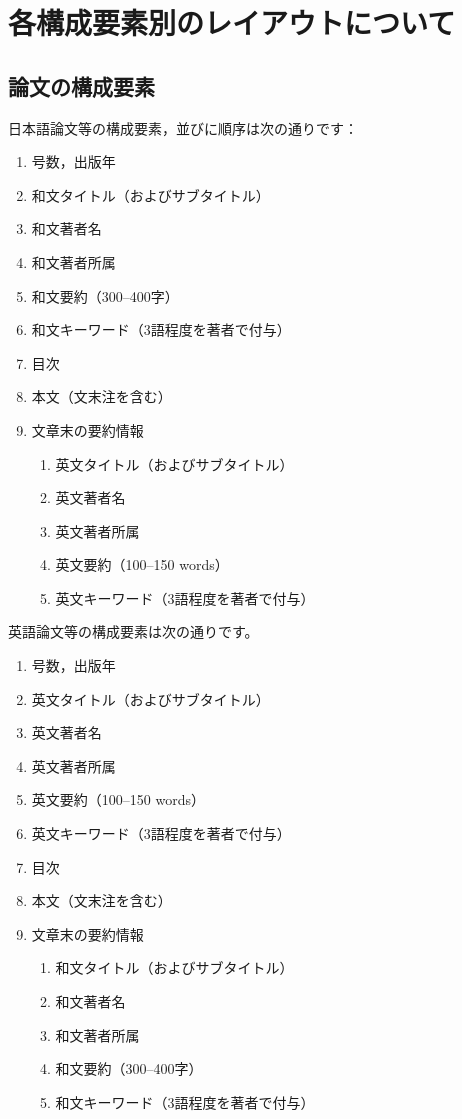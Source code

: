 \documentclass[b5paper,10pt,twocolumn,tombow]{jarticle}
\begin{document}
\section{各構成要素別のレイアウトについて}
\subsection{論文の構成要素}
日本語論文等の構成要素，並びに順序は次の通りです：
\begin{enumerate}
 \item 号数，出版年
 \item 和文タイトル（およびサブタイトル）
 \item 和文著者名
 \item 和文著者所属
 \item 和文要約（300--400字）
 \item 和文キーワード（3語程度を著者で付与）
 \item 目次
 \item 本文（文末注を含む）
 \item 文章末の要約情報
\begin{enumerate}
 \item 英文タイトル（およびサブタイトル）
 \item 英文著者名
 \item 英文著者所属
 \item 英文要約（100--150 words）
 \item 英文キーワード（3語程度を著者で付与）
\end{enumerate}
\end{enumerate}
英語論文等の構成要素は次の通りです。
\begin{enumerate}
 \item 号数，出版年
 \item 英文タイトル（およびサブタイトル）
 \item 英文著者名
 \item 英文著者所属
 \item 英文要約（100--150 words）
 \item 英文キーワード（3語程度を著者で付与）
 \item 目次
 \item 本文（文末注を含む）
 \item 文章末の要約情報
\begin{enumerate}
 \item 和文タイトル（およびサブタイトル）
 \item 和文著者名
 \item 和文著者所属
 \item 和文要約（300--400字）
 \item 和文キーワード（3語程度を著者で付与）
\end{enumerate}
\end{enumerate}
\end{document}
